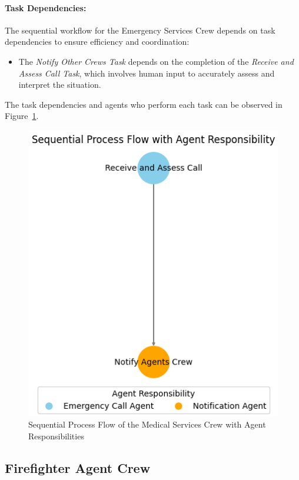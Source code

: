 \paragraph{Task Dependencies:}

The sequential workflow for the Emergency Services Crew depends on task dependencies to ensure efficiency and coordination:
\begin{itemize}
    \item The \textit{Notify Other Crews Task} depends on the completion of the \textit{Receive and Assess Call Task}, which 
    involves human input to accurately assess and interpret the situation.
\end{itemize}


The task dependencies and agents who perform each task can be observed in Figure~\ref{fig:emergency_services_flow}.

\begin{figure}[h!]
	\centering
	\includegraphics[height=0.4\textheight]{figures/emergency_services_crew_flow.png}
	\caption{Sequential Process Flow of the Medical Services Crew with Agent Responsibilities}
	\label{fig:emergency_services_flow}
\end{figure}

\subsection{Firefighter Agent Crew}

